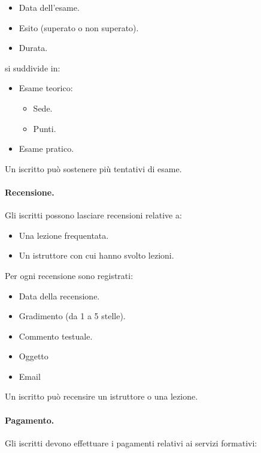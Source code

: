 \documentclass[10pt,twoside]{article}
\begin{document}
{    \begin{itemize}
            \item Data dell’esame.
            \item Esito (superato o non superato).
            \item Durata.
    \end{itemize}

    si suddivide in: 

    \begin{itemize}
        \item Esame teorico:
        \begin{itemize}
            \item Sede.
            \item Punti.
        \end{itemize}
        \item Esame pratico.
    \end{itemize}

    Un iscritto può sostenere più tentativi di esame. 


    \paragraph{Recensione.}
    Gli iscritti possono lasciare recensioni relative a:

    \begin{itemize}
        \item Una lezione frequentata.
        \item Un istruttore con cui hanno svolto lezioni.
    \end{itemize}

    Per ogni recensione sono registrati:

    \begin{itemize}
        \item Data della recensione.
        \item Gradimento (da 1 a 5 stelle).
        \item Commento testuale.
        \item Oggetto 
        \item Email
    \end{itemize}

    Un iscritto può recensire un istruttore o una lezione.


    \paragraph{Pagamento.}
    Gli iscritti devono effettuare i pagamenti relativi ai servizi formativi:

}
\end{document}
